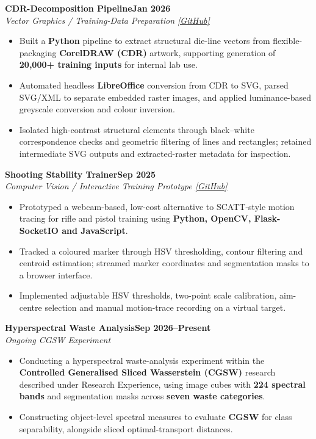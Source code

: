 \documentclass[10pt,a4paper]{article}
\newcommand{\entry}[3]{%
  \noindent\textbf{#1}\hfill\textbf{#3}\\[-1pt]
  \textit{#2}\par
}
\newenvironment{cvitems}{%
  \begin{itemize}[leftmargin=1.15em,label=\textbullet,itemsep=2.5pt,topsep=3pt,parsep=0pt,partopsep=0pt]
}{\end{itemize}}
\begin{document}
\entry{CDR-Decomposition Pipeline}{Vector Graphics / Training-Data Preparation \quad \href{https://github.com/MushuRam01/CDR-Decomposition}{[GitHub]}}{Jan 2026}
\begin{cvitems}
  \item Built a \textbf{Python} pipeline to extract structural die-line vectors from flexible-packaging \textbf{CorelDRAW (CDR)} artwork, supporting generation of \textbf{20,000+ training inputs} for internal lab use.
  \item Automated headless \textbf{LibreOffice} conversion from CDR to SVG, parsed SVG/XML to separate embedded raster images, and applied luminance-based greyscale conversion and colour inversion.
  \item Isolated high-contrast structural elements through black--white correspondence checks and geometric filtering of lines and rectangles; retained intermediate SVG outputs and extracted-raster metadata for inspection.
\end{cvitems}

\entry{Shooting Stability Trainer}{Computer Vision / Interactive Training Prototype \quad \href{https://github.com/MushuRam01/Shooting-Stability-Trainer}{[GitHub]}}{Sep 2025}
\begin{cvitems}
  \item Prototyped a webcam-based, low-cost alternative to SCATT-style motion tracing for rifle and pistol training using \textbf{Python, OpenCV, Flask-SocketIO and JavaScript}.
  \item Tracked a coloured marker through HSV thresholding, contour filtering and centroid estimation; streamed marker coordinates and segmentation masks to a browser interface.
  \item Implemented adjustable HSV thresholds, two-point scale calibration, aim-centre selection and manual motion-trace recording on a virtual target.
\end{cvitems}

\entry{Hyperspectral Waste Analysis}{Ongoing CGSW Experiment}{Sep 2026--Present}
\begin{cvitems}
  \item Conducting a hyperspectral waste-analysis experiment within the \textbf{Controlled Generalised Sliced Wasserstein (CGSW)} research described under Research Experience, using image cubes with \textbf{224 spectral bands} and segmentation masks across \textbf{seven waste categories}.
  \item Constructing object-level spectral measures to evaluate \textbf{CGSW} for class separability, alongside sliced optimal-transport distances.
\end{cvitems}
\end{document}
